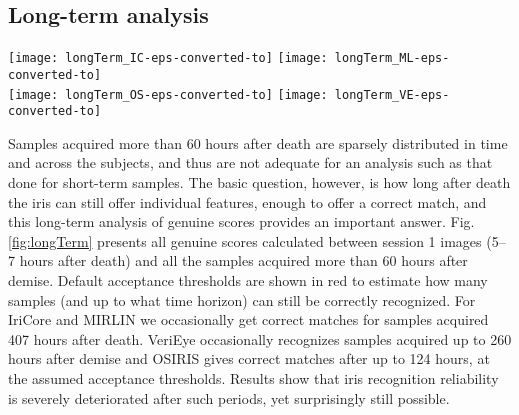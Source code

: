 \documentclass[10pt,twocolumn,letterpaper]{article}
\begin{document}
\subsection{Long-term analysis}


\begin{figure*}[!htb]
	\centering
	\texttt{[image: longTerm\_IC-eps-converted-to]}\hfill
	\texttt{[image: longTerm\_ML-eps-converted-to]}\\
	\texttt{[image: longTerm\_OS-eps-converted-to]}\hfill
	\texttt{[image: longTerm\_VE-eps-converted-to]}
	\caption{Long-term analysis. Blue dots represent comparison scores between samples acquired in the first session (\ie, 5-7 hours after decease) and samples acquired at least 60 hours after decease (as denoted on horizontal axis). Black circles are means for a given time distance between acquisitions. Scores {\bf below} the acceptance threshold denote correct matches for the \textbf{IriCore}, \textbf{MIRLIN}, and \textbf{OSIRIS} methods, while scores \textbf{above} the threshold denote correct matches for the \textbf{VeriEye} method.}
\label{fig:longTerm}
\end{figure*}

Samples acquired more than 60 hours after death are sparsely distributed in time and across the subjects, and thus are not adequate for an analysis such as that done for short-term samples. The basic question, however, is how long after death the iris can still offer individual features, enough to offer a correct match, and this long-term analysis of genuine scores provides an important answer. Fig. \ref{fig:longTerm} presents all genuine scores calculated between session 1 images (5--7 hours after death) and all the samples acquired more than 60 hours after demise. Default acceptance thresholds are shown in red to estimate how many samples (and up to what time horizon) can still be correctly recognized. For IriCore and MIRLIN we occasionally get correct matches for samples acquired 407 hours after death. VeriEye occasionally recognizes samples acquired up to 260 hours after demise and OSIRIS gives correct matches after up to 124 hours, at the assumed acceptance thresholds. Results show that iris recognition reliability is severely deteriorated after such periods, yet surprisingly still possible.
\end{document}
